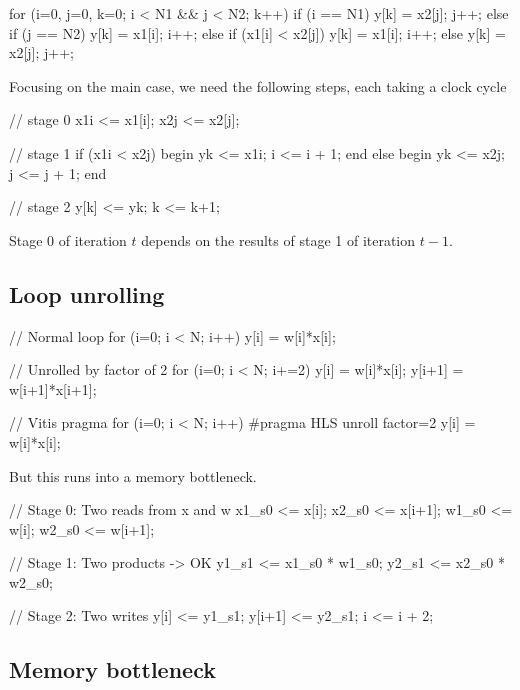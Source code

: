 \documentclass[11pt]{article}
\begin{document}
\begin{ccode}
for (i=0, j=0, k=0; i < N1 && j < N2; k++) {
  if (i == N1) {
    y[k] = x2[j];
    j++;
  } else if (j == N2) {
    y[k] = x1[i];
    i++;
  } else if (x1[i] < x2[j]) {
    y[k] = x1[i];
    i++;
  } else {
    y[k] = x2[j];
    j++;
  }
}
\end{ccode}

Focusing on the main case, 
we need the following steps, each taking a clock cycle
\begin{systemverilogcode}
// stage 0
x1i <= x1[i];
x2j <= x2[j];

// stage 1
if (x1i < x2j) begin
  yk <= x1i;
  i <= i + 1;
end else begin
  yk <= x2j;
  j <= j + 1;
end

// stage 2
y[k] <= yk;
k <= k+1;

\end{systemverilogcode}

Stage 0 of iteration $t$ depends on the results of stage 1 of iteration $t-1$.


\subsection*{Loop unrolling}

\begin{ccode}
// Normal loop
for (i=0; i < N; i++) {
  y[i] = w[i]*x[i];
}

// Unrolled by factor of 2
for (i=0; i < N; i+=2) {
  y[i] = w[i]*x[i];
  y[i+1] = w[i+1]*x[i+1];
}

\end{ccode}

\begin{ccode}
// Vitis pragma
for (i=0; i < N; i++) {
#pragma HLS unroll factor=2
  y[i] = w[i]*x[i];
}

\end{ccode}

But this runs into a memory bottleneck.

\begin{systemverilogcode}

// Stage 0:  Two reads from x and w
x1_s0 <= x[i];
x2_s0 <= x[i+1];
w1_s0 <= w[i];
w2_s0 <= w[i+1];

// Stage 1:  Two products  -> OK
y1_s1 <= x1_s0 * w1_s0;
y2_s1 <= x2_s0 * w2_s0;

// Stage 2:  Two writes
y[i] <= y1_s1;
y[i+1] <= y2_s1;
i <= i + 2;
\end{systemverilogcode}

\subsection*{Memory bottleneck}
\end{document}
